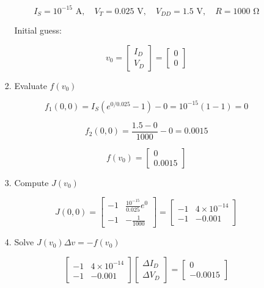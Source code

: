 \documentclass[12pt]{article}
\begin{document}
\begin{enumerate}
\begin{enumerate}
\begin{enumerate}
        \[
        I_S = 10^{-15} \text{ A}, \quad V_T = 0.025 \text{ V}, \quad V_{DD} = 1.5 \text{ V}, \quad R = 1000 \text{ Ω}
        \]

        Initial guess:

        \[
        v_0 =
        \begin{bmatrix}
        I_D \\
        V_D
        \end{bmatrix}
        =
        \begin{bmatrix}
        0 \\
        0
        \end{bmatrix}
        \]

        \item Evaluate \( f(v_0) \)

        \[
        f_1(0, 0) = I_S \left(e^{0 / 0.025} - 1 \right) - 0 = 10^{-15} (1 - 1) = 0
        \]

        \[
        f_2(0, 0) = \frac{1.5 - 0}{1000} - 0 = 0.0015
        \]

        \[
        f(v_0) =
        \begin{bmatrix}
        0 \\
        0.0015
        \end{bmatrix}
        \]

        \item Compute \( J(v_0) \)

        \[
        J(0, 0) =
        \begin{bmatrix}
        -1 & \frac{10^{-15}}{0.025} e^{0} \\
        -1 & -\frac{1}{1000}
        \end{bmatrix}
        =
        \begin{bmatrix}
        -1 & 4 \times 10^{-14} \\
        -1 & -0.001
        \end{bmatrix}
        \]

        \item Solve \( J(v_0) \Delta v = -f(v_0) \)

        \[
        \begin{bmatrix}
        -1 & 4 \times 10^{-14} \\
        -1 & -0.001
        \end{bmatrix}
        \begin{bmatrix}
        \Delta I_D \\
        \Delta V_D
        \end{bmatrix}
        =
        \begin{bmatrix}
        0 \\
        -0.0015
        \end{bmatrix}
        \]


\end{enumerate}
\end{enumerate}
\end{enumerate}
\end{document}

